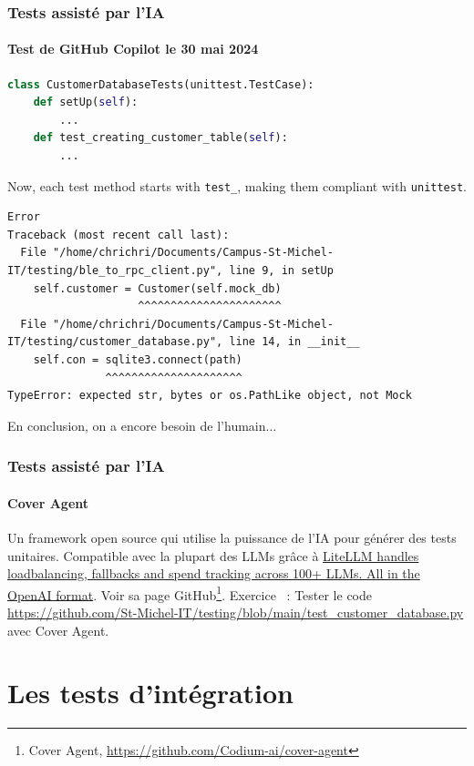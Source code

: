 \documentclass{beamer}
\begin{document}
    \begin{frame}[fragile]
        \transdissolve
        \frametitle{Tests assisté par l'IA}
        \framesubtitle{Test de GitHub Copilot le 30 mai 2024}
        \begin{lstlisting}[language=Python]
class CustomerDatabaseTests(unittest.TestCase):
    def setUp(self):
        ...
    def test_creating_customer_table(self):
        ...
        \end{lstlisting}
        Now, each test method starts with \lstinline{test_}, making them compliant with \lstinline{unittest}.
        \begin{lstlisting}
Error
Traceback (most recent call last):
  File "/home/chrichri/Documents/Campus-St-Michel-IT/testing/ble_to_rpc_client.py", line 9, in setUp
    self.customer = Customer(self.mock_db)
                    ^^^^^^^^^^^^^^^^^^^^^^
  File "/home/chrichri/Documents/Campus-St-Michel-IT/testing/customer_database.py", line 14, in __init__
    self.con = sqlite3.connect(path)
               ^^^^^^^^^^^^^^^^^^^^^
TypeError: expected str, bytes or os.PathLike object, not Mock
        \end{lstlisting}
        En conclusion, on a encore besoin de l'humain...
    \end{frame}

    \begin{frame}[fragile]
        \transdissolve
        \frametitle{Tests assisté par l'IA}
        \framesubtitle{Cover Agent}
        Un framework open source qui utilise la puissance de l'IA pour générer des tests unitaires.
        Compatible avec la plupart des LLMs grâce à \href{https://www.litellm.ai/}{LiteLLM handles loadbalancing, fallbacks and spend tracking across 100+ LLMs. All in the OpenAI format}. Voir sa page GitHub\footnote{Cover Agent, \url{https://github.com/Codium-ai/cover-agent}}.
        \bigbreak
        Exercice \execcounterdispinc{}~: Tester le code \url{https://github.com/St-Michel-IT/testing/blob/main/test_customer_database.py} avec Cover Agent.
    \end{frame}


    \section{Les tests d’intégration}\label{sec:les-tests-d-integration}
\end{document}
